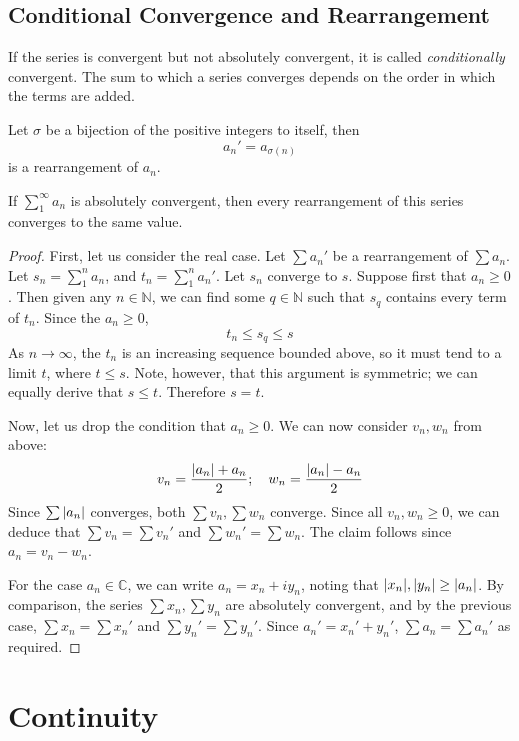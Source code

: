 \documentclass{article}
\begin{document}
\subsection{Conditional Convergence and Rearrangement}
If the series is convergent but not absolutely convergent, it is called \textit{conditionally} convergent. The sum to which a series converges depends on the order in which the terms are added.
\begin{definition}
    Let $\sigma$ be a bijection of the positive integers to itself, then
    \[ a_n' = a_{\sigma(n)} \]
    is a rearrangement of $a_n$.
\end{definition}
\begin{theorem}
    If $\sum_1^\infty a_n$ is absolutely convergent, then every rearrangement of this series converges to the same value.
\end{theorem}
\begin{proof}
    First, let us consider the real case. Let $\sum a_n'$ be a rearrangement of $\sum a_n$. Let $s_n = \sum_1^n a_n$, and $t_n = \sum_1^n a_n'$. Let $s_n$ converge to $s$. Suppose first that $a_n \geq 0$. Then given any $n \in \mathbb N$, we can find some $q \in \mathbb N$ such that $s_q$ contains every term of $t_n$. Since the $a_n \geq 0$,
    \[ t_n \leq s_q \leq s \]
    As $n \to \infty$, the $t_n$ is an increasing sequence bounded above, so it must tend to a limit $t$, where $t \leq s$. Note, however, that this argument is symmetric; we can equally derive that $s \leq t$. Therefore $s = t$.

    Now, let us drop the condition that $a_n \geq 0$. We can now consider $v_n, w_n$ from above:
    \[ v_n = \frac{\abs{a_n} + a_n}{2};\quad w_n = \frac{\abs{a_n} - a_n}{2} \]
    Since $\sum\abs{a_n}$ converges, both $\sum v_n, \sum w_n$ converge. Since all $v_n, w_n \geq 0$, we can deduce that $\sum v_n = \sum v_n'$ and $\sum w_n' = \sum w_n$. The claim follows since $a_n = v_n - w_n$.

    For the case $a_n \in \mathbb C$, we can write $a_n = x_n + iy_n$, noting that $\abs{x_n}, \abs{y_n} \geq \abs{a_n}$. By comparison, the series $\sum x_n, \sum y_n$ are absolutely convergent, and by the previous case, $\sum x_n = \sum x_n'$ and $\sum y_n' = \sum y_n'$. Since $a_n' = x_n' + y_n'$, $\sum a_n = \sum a_n'$ as required.
\end{proof}

\section{Continuity}
\end{document}
